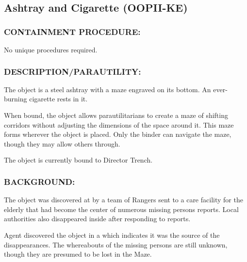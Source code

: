 \subsection*{Ashtray and Cigarette (OOPII-KE)}
\subsubsection*{CONTAINMENT PROCEDURE:}
\par No unique procedures required.
\subsubsection*{DESCRIPTION/PARAUTILITY:}
\par The object is a steel ashtray with a maze
engraved on its bottom. An ever-burning
cigarette rests in it.
\par When bound, the object allows
parautilitarians to create a maze of shifting corridors without
adjusting the dimensions of the space around it. This maze forms
wherever the object is placed. Only the binder can navigate the
maze, though they may allow others through.
\par The object is currently bound to Director Trench.
\subsubsection*{BACKGROUND:}
\par The object was discovered at 
by a team of Rangers sent to a care facility for the elderly that had
become the center of numerous missing persons reports. Local
authorities also disappeared inside after responding to reports.
\par Agent 
discovered the object in a 
which indicates it was the source of the disappearances. The
whereabouts of the missing persons are still unknown, though
they are presumed to be lost in the Maze.